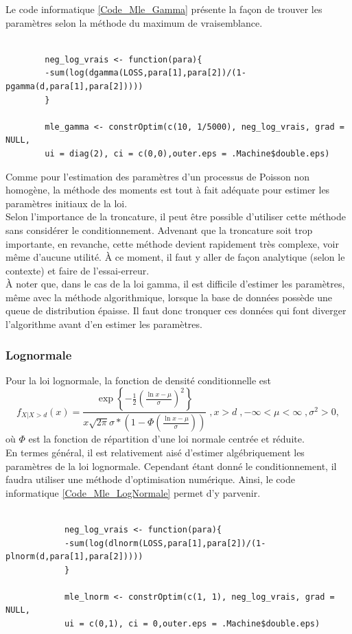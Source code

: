 		Le code informatique \ref{Code_Mle_Gamma} présente la façon de trouver les paramètres selon la méthode du maximum de vraisemblance.
		\begin{Code}\label{Code_Mle_Gamma}
		\begin{verbatim}
		
		neg_log_vrais <- function(para){
		-sum(log(dgamma(LOSS,para[1],para[2])/(1-pgamma(d,para[1],para[2]))))
		}
		
		mle_gamma <- constrOptim(c(10, 1/5000), neg_log_vrais, grad = NULL, 
		ui = diag(2), ci = c(0,0),outer.eps = .Machine$double.eps)
		\end{verbatim}
		\end{Code}

		Comme pour l'estimation des paramètres d'un processus de Poisson non homogène, la méthode des moments est tout à fait adéquate pour estimer les paramètres initiaux de la loi.\\
		
		Selon l'importance de la troncature, il peut être possible d'utiliser cette méthode sans considérer le conditionnement. Advenant que la troncature soit trop importante, en revanche, cette méthode devient rapidement très complexe, voir même d'aucune utilité. À ce moment, il faut y aller de façon analytique (selon le contexte) et faire de l'essai-erreur. \\
		
		À noter que, dans le cas de la loi gamma, il est difficile d'estimer les paramètres, même avec la méthode algorithmique, lorsque la base de données possède une queue de distribution épaisse. Il faut donc tronquer ces données qui font diverger l'algorithme avant d'en estimer les paramètres.
		
		\subsubsection{Lognormale}
		Pour la loi lognormale, la fonction de densité conditionnelle est 
		$$f_{X|X>d}(x) = \frac{\exp\left\lbrace -\frac{1}{2}(\frac{\ln x-\mu}{\sigma})^2\right\rbrace }{x\sqrt{2\pi}\sigma * (1-\Phi(\frac{\ln x - \mu}{\sigma}))}\;, x>d \;, -\infty < \mu < \infty \;, \sigma^2 >0,$$
		où $\Phi$ est la fonction de répartition d'une loi normale centrée et réduite.\\
		
		En termes général, il est relativement aisé d'estimer algébriquement les paramètres de la loi lognormale. Cependant étant donné le conditionnement, il faudra utiliser une méthode d'optimisation numérique. Ainsi, le code informatique \ref{Code_Mle_LogNormale} permet d'y parvenir.
		\begin{Code}\label{Code_Mle_LogNormale}
			\begin{verbatim}
			
			neg_log_vrais <- function(para){
			-sum(log(dlnorm(LOSS,para[1],para[2])/(1-plnorm(d,para[1],para[2]))))
			}
			
			mle_lnorm <- constrOptim(c(1, 1), neg_log_vrais, grad = NULL, 
			ui = c(0,1), ci = 0,outer.eps = .Machine$double.eps)
			\end{verbatim}		
		\end{Code}

